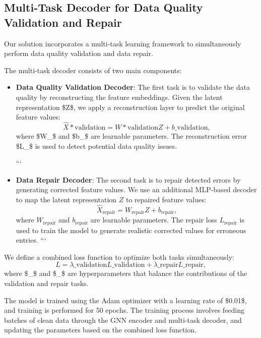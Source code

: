 \subsection{Multi-Task Decoder for Data Quality Validation and Repair}

Our solution incorporates a multi-task learning framework to simultaneously perform data quality validation and data repair.

The multi-task decoder consists of two main components:

\begin{itemize}
\item \textbf{Data Quality Validation Decoder}: The first task is to validate the data quality by reconstructing the feature embeddings. Given the latent representation \$Z\$, we apply a reconstruction layer to predict the original feature values:
\begin{equation}
\hat{X}*{\text{validation}} = W*{\text{validation}} Z + b\_{\text{validation}},
\end{equation}
where \$W\_{}\$ and \$b\_{}\$ are learnable parameters. The reconstruction error \$L\_{}\$ is used to detect potential data quality issues.

```
\item \textbf{Data Repair Decoder}: The second task is to repair detected errors by generating corrected feature values. We use an additional MLP-based decoder to map the latent representation $Z$ to repaired feature values:
\begin{equation}
\hat{X}_{\text{repair}} = W_{\text{repair}} Z + b_{\text{repair}},
\end{equation}
where $W_{\text{repair}}$ and $b_{\text{repair}}$ are learnable parameters. The repair loss $L_{\text{repair}}$ is used to train the model to generate realistic corrected values for erroneous entries.
```

\end{itemize}

We define a combined loss function to optimize both tasks simultaneously:
\begin{equation}
L = \lambda\_{\text{validation}} L\_{\text{validation}} + \lambda\_{\text{repair}} L\_{\text{repair}},
\end{equation}
where \$\lambda\_{}\$ and \$\lambda\_{}\$ are hyperparameters that balance the contributions of the validation and repair tasks.

The model is trained using the Adam optimizer with a learning rate of \$0.01\$, and training is performed for 50 epochs. The training process involves feeding batches of clean data through the GNN encoder and multi-task decoder, and updating the parameters based on the combined loss function.

